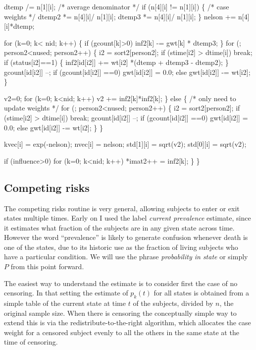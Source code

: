\documentclass{article}
\begin{document}
\begin{nwchunk}
             dtemp /=  n[1][i];        /* average denominator */
             if (n[4][i] != n[1][i]) \{ /* case weights */
                 dtemp2 *= n[4][i]/ n[1][i];
                 dtemp3 *= n[4][i]/ n[1][i];
             \}
             nelson += n[4][i]*dtemp;
 
             for (k=0; k< nid; k++) \{
                 if (gcount[k]>0) inf2[k] -= gwt[k] * dtemp3;
             \}
             for (; person2<nused; person2++) \{ 
                  i2 = sort2[person2];
                 if (stime[i2] > dtime[i]) break;
                 if (status[i2]==1) \{
                     inf2[id[i2]] += wt[i2] *(dtemp + dtemp3 - dtemp2);
                 \}
                 gcount[id[i2]] --;
                 if (gcount[id[i2]] ==0) gwt[id[i2]] = 0.0;
                 else gwt[id[i2]] -= wt[i2];
             \}
     
             v2=0;
             for (k=0; k<nid; k++) v2 += inf2[k]*inf2[k];
         \}
         else \{ /* only need to update weights */
             for (; person2<nused; person2++) \{ 
                 i2 = sort2[person2];
                 if (stime[i2] > dtime[i]) break;
                 gcount[id[i2]] --;
                 if (gcount[id[i2]] ==0) gwt[id[i2]] = 0.0;
                 else gwt[id[i2]] -= wt[i2];
             \}
         \}
         
         kvec[i] = exp(-nelson);
         nvec[i] = nelson;
         std[1][i] = sqrt(v2);
         std[0][i] = sqrt(v2);
         
         if (influence>0)
             for (k=0; k<nid; k++) *imat2++ = inf2[k];
     \}
 \}
\end{nwchunk}


\subsection{Competing risks}
\newcommand{\Twid}{\mbox{\(\tt\sim\)}}
The competing risks routine is very general, allowing subjects
to enter or exit states multiple times.
Early on I used the label \emph{current prevalence} estimate, 
since it estimates what fraction of the subjects are in any
given state across time.  
However the word ``prevalence'' is likely to generate confusion whenever
death is one of the states, due to its historic use as the fraction of
living subjects who have a particular condition.
We will use the phrase \emph{probability in state} or simply $P$
from this point forward.

The easiest way to understand the estimate is to consider first the
case of no censoring.  
In that setting the estimate of $p_k(t)$ for all states
is obtained from a simple table of the current state at time $t$
of the subjects, divided by $n$, the original
sample size.
When there is censoring the conceptually simple way to extend this
is via the redistribute-to-the-right algorithm, which allocates the
case weight for a censored subject evenly to all the others in the
same state at the time of censoring.  
\end{document}

